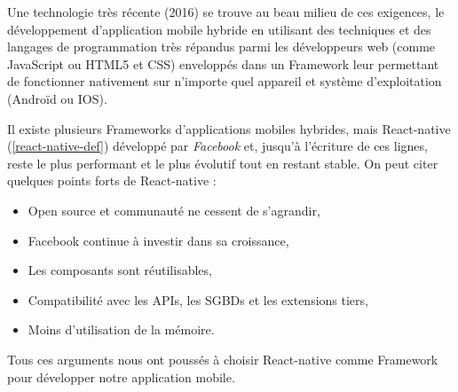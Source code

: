 Une technologie très récente (2016) se trouve au beau milieu de ces exigences, le développement d'application mobile hybride en utilisant des techniques et des langages de programmation très répandus parmi les développeurs web (comme JavaScript ou HTML5 et CSS) enveloppés dans un Framework leur permettant de fonctionner nativement sur n'importe quel appareil et système d'exploitation (Androïd ou IOS).

Il existe plusieurs Frameworks d'applications mobiles hybrides, mais React-native (\autoref{react-native-def}) développé par \emph{Facebook} et, jusqu'à l'écriture de ces lignes, reste le plus performant et le plus évolutif tout en restant stable. On peut citer quelques points forts de React-native : 
\begin{itemize}
    \item Open source et communauté ne cessent de s'agrandir,
    \item Facebook continue à investir dans sa croissance,
    \item Les composants sont réutilisables,
    \item Compatibilité avec les APIs, les SGBDs et les extensions tiers,
    \item Moins d'utilisation de la mémoire.
\end{itemize}
Tous ces arguments nous ont poussés à choisir React-native comme Framework pour développer notre application mobile. 


